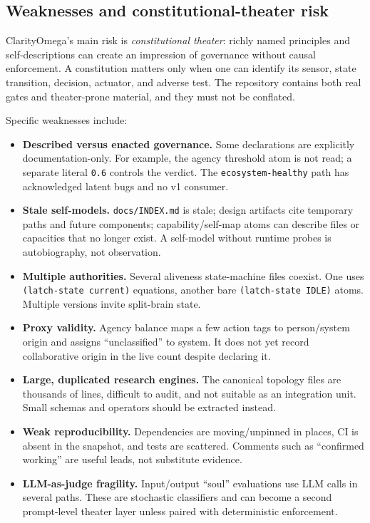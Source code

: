 \documentclass[11pt]{article}
\begin{document}
\subsection{Weaknesses and constitutional-theater risk}

ClarityOmega's main risk is \emph{constitutional theater}: richly named
principles and self-descriptions can create an impression of governance without
causal enforcement.  A constitution matters only when one can identify its
sensor, state transition, decision, actuator, and adverse test.  The repository
contains both real gates and theater-prone material, and they must not be
conflated.

Specific weaknesses include:

\begin{itemize}
\item \textbf{Described versus enacted governance.}  Some declarations are
explicitly documentation-only.  For example, the agency threshold atom is not
read; a separate literal \texttt{0.6} controls the verdict.  The
\texttt{ecosystem-healthy} path has acknowledged latent bugs and no v1 consumer.
\item \textbf{Stale self-models.}  \texttt{docs/INDEX.md} is stale; design
artifacts cite temporary paths and future components; capability/self-map atoms
can describe files or capacities that no longer exist.  A self-model without
runtime probes is autobiography, not observation.
\item \textbf{Multiple authorities.}  Several aliveness state-machine files
coexist.  One uses \texttt{(latch-state current)} equations, another bare
\texttt{(latch-state IDLE)} atoms.  Multiple versions invite split-brain state.
\item \textbf{Proxy validity.}  Agency balance maps a few action tags to
person/system origin and assigns ``unclassified'' to system.  It does not yet
record collaborative origin in the live count despite declaring it.
\item \textbf{Large, duplicated research engines.}  The canonical topology
files are thousands of lines, difficult to audit, and not suitable as an
integration unit.  Small schemas and operators should be extracted instead.
\item \textbf{Weak reproducibility.}  Dependencies are moving/unpinned in
places, CI is absent in the snapshot, and tests are scattered.  Comments such
as ``confirmed working'' are useful leads, not substitute evidence.
\item \textbf{LLM-as-judge fragility.}  Input/output ``soul'' evaluations use
LLM calls in several paths.  These are stochastic classifiers and can become a
second prompt-level theater layer unless paired with deterministic enforcement.
\end{itemize}
\end{document}
